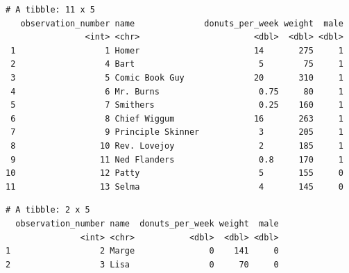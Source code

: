 \documentclass[]{book}
\newenvironment{Shaded}{\begin{snugshade}}{\end{snugshade}}
\newcommand{\DecValTok}[1]{\textcolor[rgb]{0.00,0.00,0.81}{#1}}
\newcommand{\KeywordTok}[1]{\textcolor[rgb]{0.13,0.29,0.53}{\textbf{#1}}}
\newcommand{\NormalTok}[1]{#1}
\newcommand{\OperatorTok}[1]{\textcolor[rgb]{0.81,0.36,0.00}{\textbf{#1}}}
\newcommand{\StringTok}[1]{\textcolor[rgb]{0.31,0.60,0.02}{#1}}
\begin{document}
\begin{Shaded}
\end{Shaded}

\begin{verbatim}
# A tibble: 11 x 5
   observation_number name              donuts_per_week weight  male
                <int> <chr>                       <dbl>  <dbl> <dbl>
 1                  1 Homer                       14       275     1
 2                  4 Bart                         5        75     1
 3                  5 Comic Book Guy              20       310     1
 4                  6 Mr. Burns                    0.75     80     1
 5                  7 Smithers                     0.25    160     1
 6                  8 Chief Wiggum                16       263     1
 7                  9 Principle Skinner            3       205     1
 8                 10 Rev. Lovejoy                 2       185     1
 9                 11 Ned Flanders                 0.8     170     1
10                 12 Patty                        5       155     0
11                 13 Selma                        4       145     0
\end{verbatim}

\begin{Shaded}
\end{Shaded}

\begin{verbatim}
# A tibble: 2 x 5
  observation_number name  donuts_per_week weight  male
               <int> <chr>           <dbl>  <dbl> <dbl>
1                  2 Marge               0    141     0
2                  3 Lisa                0     70     0
\end{verbatim}

\begin{Shaded}
\end{Shaded}
\end{document}
